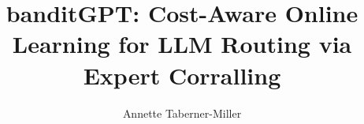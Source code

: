 
\usepackage{algorithm}
\usepackage{algorithmic}
\usepackage{multirow}
\usepackage{enumitem}
\usepackage{xurl}

\setlength{\emergencystretch}{3em}

\newcommand{\neff}{n_{\text{eff}}}
\newcommand{\thetavec}{\boldsymbol{\theta}}
\newcommand{\betavec}{\boldsymbol{\beta}}
\newcommand{\Amat}{\mathbf{A}}
\newcommand{\bvec}{\mathbf{b}}
\newcommand{\xvec}{\mathbf{x}}

\title{banditGPT: Cost-Aware Online Learning for LLM Routing via Expert Corralling}

\author{Annette Taberner-Miller}

